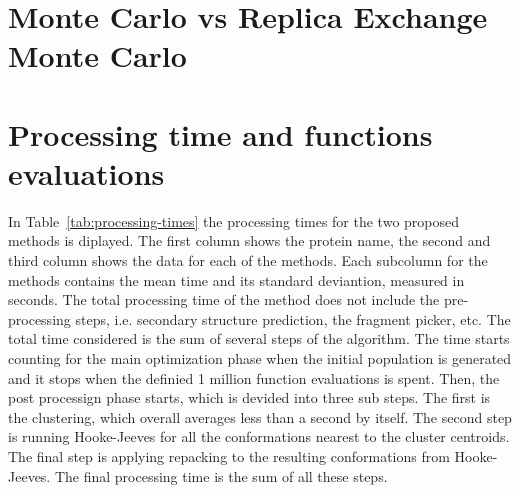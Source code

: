 \section{Monte Carlo vs Replica Exchange Monte Carlo}

\section{Processing time and functions evaluations}

In Table~\ref{tab:processing-times} the processing times for the two proposed
methods is diplayed. The first column shows the protein name, the second and
third column shows the data for each of the methods. Each subcolumn for the
methods contains the mean time and its standard deviantion, measured in seconds.
The total processing time of the method does not include the pre-processing
steps, i.e. secondary structure prediction, the fragment picker, etc. The total
time considered is the sum of several steps of the algorithm. The time starts
counting for the main optimization phase when the initial population is
generated and it stops when the definied 1 million function evaluations is
spent. Then, the post processign phase starts, which is devided into three
sub steps. The first is the clustering, which overall averages less than a
second by itself. The second step is running Hooke-Jeeves for all the
conformations nearest to the cluster centroids. The final step is applying
repacking to the resulting conformations from Hooke-Jeeves. The final
processing time is the sum of all these steps.

